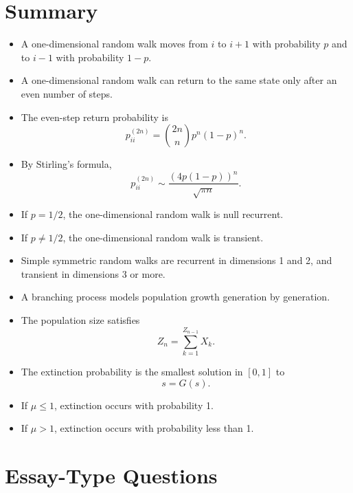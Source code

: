 \documentclass[12pt,a4paper]{article}
\theoremstyle{lecturestyle}
\begin{document}
\section{Summary}

\begin{itemize}[leftmargin=1.2cm]
    \item A one-dimensional random walk moves from $i$ to $i+1$ with probability $p$ and to $i-1$ with probability $1-p$.
    \item A one-dimensional random walk can return to the same state only after an even number of steps.
    \item The even-step return probability is
    \[
    p_{ii}^{(2n)}=\binom{2n}{n}p^n(1-p)^n.
    \]
    \item By Stirling's formula,
    \[
    p_{ii}^{(2n)}\sim \frac{(4p(1-p))^n}{\sqrt{\pi n}}.
    \]
    \item If $p=1/2$, the one-dimensional random walk is null recurrent.
    \item If $p\neq1/2$, the one-dimensional random walk is transient.
    \item Simple symmetric random walks are recurrent in dimensions 1 and 2, and transient in dimensions 3 or more.
    \item A branching process models population growth generation by generation.
    \item The population size satisfies
    \[
    Z_n=\sum_{k=1}^{Z_{n-1}}X_k.
    \]
    \item The extinction probability is the smallest solution in $[0,1]$ to
    \[
    s=G(s).
    \]
    \item If $\mu\leq1$, extinction occurs with probability 1.
    \item If $\mu>1$, extinction occurs with probability less than 1.
\end{itemize}

\section{Essay-Type Questions}
\end{document}
